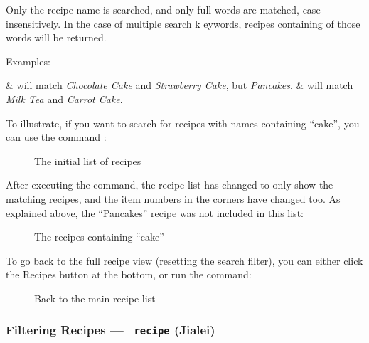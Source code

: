 	Only the recipe name is searched, and only full words are matched, case-insensitively. In the case of multiple search k
	eywords, recipes containing  of those words will be returned.

	Examples:
	\begin{bulletlist}
		&  will match \emph{Chocolate Cake} and \emph{Strawberry Cake}, but  \emph{Pancakes}.
		&  will match \emph{Milk Tea} and \emph{Carrot Cake}.
	\end{bulletlist}


	To illustrate, if you want to search for recipes with names containing \enquote{cake}, you can use the command :

	\begin{figure}[!htbp]\centering\ContinuedFloat*
		\caption{The initial list of recipes}
	\end{figure}

	After executing the command, the recipe list has changed to only show the matching recipes, and the item numbers
	in the corners have changed too. As explained above, the \enquote{Pancakes} recipe was not included in this list:
	\vspace{-1em} %

	\begin{figure}[!htbp]\centering\ContinuedFloat
		\caption{The recipes containing \enquote{cake}}
	\end{figure}

	\vspace{-1.5em} %
	To go back to the full recipe view (resetting the search filter), you can either click the Recipes button at the bottom, or run the
	 command:

	\vspace{-1.5em} %
	\begin{figure}[!htbp]\centering\ContinuedFloat
		\caption{Back to the main recipe list}
	\end{figure}
	\vspace{-3em} %









\hypertarget{FilterRecipeCommand}{}
\subsubsection{Filtering Recipes — \texttt{ recipe} (Jialei)}


